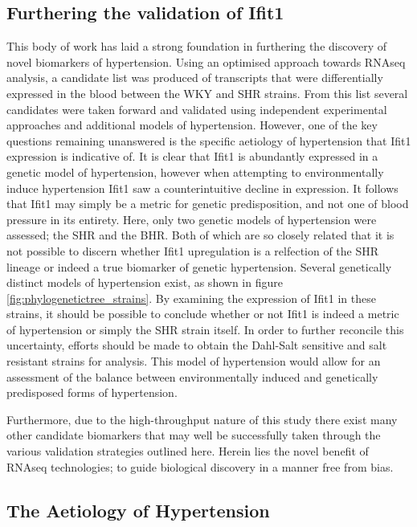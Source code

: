 \subsection{Furthering the validation of Ifit1}

This body of work has laid a strong foundation in furthering the discovery of novel biomarkers of hypertension. Using an optimised approach towards RNAseq analysis, a candidate list was produced of transcripts that were differentially expressed in the blood between the WKY and SHR strains. From this list several candidates were taken forward and validated using independent experimental approaches and additional models of hypertension. However, one of the key questions remaining unanswered is the specific aetiology of hypertension that Ifit1 expression is indicative of. It is clear that Ifit1 is abundantly expressed in a genetic model of hypertension, however when attempting to environmentally induce hypertension Ifit1 saw a counterintuitive decline in expression. It follows that Ifit1 may simply be a metric for genetic predisposition, and not one of blood pressure in its entirety. Here, only two genetic models of hypertension were assessed; the SHR and the BHR. Both of which are so closely related that it is not possible to discern whether Ifit1 upregulation is a relfection of the SHR lineage or indeed a true biomarker of genetic hypertension. Several genetically distinct models of hypertension exist, as shown in figure \ref{fig:phylogenetictree_strains}. By examining the expression of Ifit1 in these strains, it should be possible to conclude whether or not Ifit1 is indeed a metric of hypertension or simply the SHR strain itself. In order to further reconcile this uncertainty, efforts should be made to obtain the Dahl-Salt sensitive and salt resistant strains for analysis. This model of hypertension would allow for an assessment of the balance between environmentally induced and genetically predisposed forms of hypertension. 

Furthermore, due to the high-throughput nature of this study there exist many other candidate biomarkers that may well be successfully taken through the various validation strategies outlined here. Herein lies the novel benefit of RNAseq technologies; to guide biological discovery in a manner free from bias. 

\subsection{The Aetiology of Hypertension}

